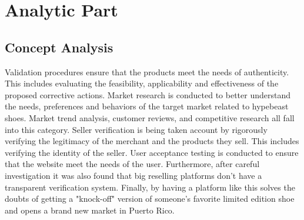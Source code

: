 \chapter{Analytic Part}
\newpage
\section{Concept Analysis}
\hspace{1cm} Validation procedures ensure that the products meet the needs of authenticity. This includes evaluating the feasibility, applicability and effectiveness of the proposed corrective actions.
Market research is conducted to better understand the needs, preferences and behaviors of the target market related to hypebeast shoes. Market trend analysis, customer reviews, and competitive research all fall into this category.
Seller verification is being taken account by rigorously verifying the legitimacy of the merchant and the products they sell. This includes verifying the identity of the seller.
User acceptance testing is conducted to ensure that the website meet the needs of the user.
Furthermore, after careful investigation it was also found that big reselling platforms don't have a transparent verification system. Finally, by having a platform like this solves the doubts of getting a "knock-off" version of someone's favorite limited edition shoe and opens a brand new market in Puerto Rico.
